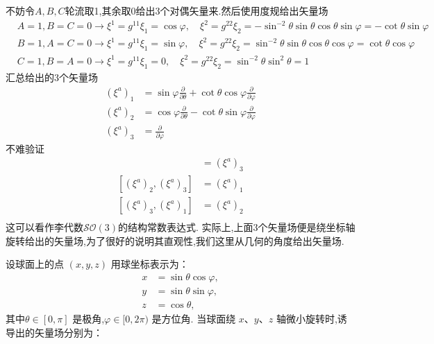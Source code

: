 \documentclass[../main.tex]{subfiles}
\begin{document}
不妨令$A,B,C$轮流取1,其余取0给出3个对偶矢量来.然后使用度规给出矢量场
\begin{align*}
	 & A = 1,B=C=0 \rightarrow \xi^1 = g^{11}\xi_1 = \cos\varphi ,\quad \xi^2 =g^{22}\xi_2 = -\sin^{-2}\theta \sin\theta \cos\theta \sin\varphi = -\cot\theta\sin\varphi \\
	 & B = 1,A=C=0 \rightarrow \xi^1 = g^{11}\xi_1 = \sin\varphi ,\quad \xi^2 =g^{22}\xi_2 =\sin^{-2}\theta \sin\theta \cos\theta \cos\varphi =\cot\theta\cos\varphi     \\
	 & C = 1,B=A=0 \rightarrow \xi^1 = g^{11}\xi_1 =0 ,\quad \xi^2 =g^{22}\xi_2 = \sin^{-2}\theta \sin^2\theta  =1
\end{align*}
汇总给出的3个矢量场\begin{align}
	(\xi^a)_1 & = \sin \varphi \frac{\partial}{\partial \theta} +\cot \theta \cos \varphi\frac{\partial}{\partial \varphi} \\
	(\xi^a)_2 & = \cos \varphi \frac{\partial}{\partial \theta} -\cot \theta \sin \varphi\frac{\partial}{\partial \varphi} \\
	(\xi^a)_3 & = \frac{\partial}{\partial \varphi}
\end{align}
不难验证\begin{align*}
	[(\xi^a)_1,(\xi^a)_2] & =(\xi^a)_3 \\
	[(\xi^a)_2,(\xi^a)_3] & =(\xi^a)_1 \\
	[(\xi^a)_3,(\xi^a)_1] & =(\xi^a)_2 \\
\end{align*}
这可以看作李代数$\mathscr{SO}(3)$的结构常数表达式.
实际上,上面3个矢量场便是绕坐标轴旋转给出的矢量场,为了很好的说明其直观性,我们这里从几何的角度给出矢量场.

设球面上的点 \((x, y, z)\) 用球坐标表示为：
\[
	\begin{aligned}
		x & =  \sin\theta \cos\varphi, \\
		y & =  \sin\theta \sin\varphi, \\
		z & =  \cos\theta,
	\end{aligned}
\]
其中\(\theta \in [0, \pi]\) 是极角,\(\varphi \in [0, 2\pi)\) 是方位角.
当球面绕 \(x\)、\(y\)、\(z\) 轴微小旋转时,诱导出的矢量场分别为：
\end{document}
